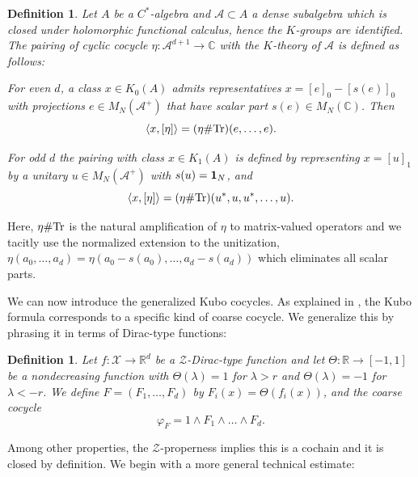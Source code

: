 \documentclass[12pt]{amsart}
\newtheorem{definition}[theorem]{Definition}
\newcommand{\CM}{{\mathbb C}}
\newcommand{\RM}{{\mathbb R}}
\newcommand{\Aa}{{\mathcal A}}
\newcommand{\Xx}{{\mathcal X}}
\newcommand{\Zz}{{\mathcal Z}}
\newcommand{\one}{{\bf 1}}
\newcommand{\Tr}{\mbox{\rm Tr}}
\begin{document}
\begin{definition}
Let $A$ be a $C^*$-algebra and $\Aa \subset A$ a dense subalgebra which is closed under holomorphic functional calculus, hence the $K$-groups are identified. The pairing of cyclic cocycle $\eta: \Aa^{d+1}\to \CM$ with the $K$-theory of $\Aa$ is defined as follows:

For even $d$, a class $x\in K_0(A)$ admits representatives $x=[e]_0-[s(e)]_0$ with projections $e\in M_N(\Aa^+)$ that have scalar part $s(e)\in M_N(\CM)$. Then 
$$\langle x, [\eta] \rangle = (\eta\# \Tr)(e,\dots,e).$$

For odd $d$ the pairing with class $x\in K_1(A)$ is defined by representing $x=[u]_1$
by a unitary $u\in M_N(\Aa^+)$ with $s(u)=\one_N$, and
$$\langle x, [\eta] \rangle = (\eta\# \Tr)(u^*,u,u^*,\dots,u).$$
\end{definition}
Here, $\eta\#\Tr$ is the natural amplification of $\eta$ to matrix-valued operators and we tacitly use the normalized extension to the unitization, $\eta(a_0,\ldots,a_d)=\eta(a_0-s(a_0),\ldots,a_d-s(a_d))$ which eliminates all scalar parts.


We can now introduce the generalized Kubo cocycles. As explained in \cite{LudewigThiang25}, the Kubo formula corresponds to a specific kind of coarse cocycle. We generalize this by phrasing it in terms of Dirac-type functions:
\begin{definition}
\label{def:F}
Let $f:\Xx\to \RM^d$ be a $\Zz$-Dirac-type function and let $\Theta: \RM\to [-1,1]$ be a nondecreasing function with $\Theta(\lambda)=1$ for $\lambda > r$ and $\Theta(\lambda)=-1$ for $\lambda< -r$. We define $F=(F_1,\ldots,F_d)$ by $F_i(x)=\Theta(f_i(x))$, and the coarse cocycle $$\varphi_F = 1 \wedge F_1 \wedge \dots \wedge F_d.$$
\end{definition}
Among other properties, the $\Zz$-properness implies this is a cochain and it is closed by definition. We begin with a more general technical estimate:
\end{document}
